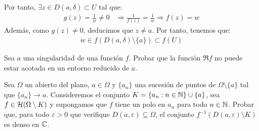 \begin{ejercicio}
\begin{description}
        Por tanto, $\exists z \in D(a, \delta)\subset U$ tal que:
        \begin{align*}
            g(z) = \frac{1}{w}\neq 0 &\Longrightarrow \frac{1}{f(z)} = \frac{1}{w}
            \Longrightarrow f(z) = w
        \end{align*}
        Además, como $g(z)\neq 0$, deducimos que $z\neq a$. Por tanto, tenemos que:
        \begin{align*}
            w \in f\left(D(a, \delta)\setminus \{a\}\right) \subset f(U)
        \end{align*}
    \end{description}
\end{ejercicio}


\begin{ejercicio}
    Sea $a$ una singularidad de una función $f$. Probar que la función $\Re f$ no puede estar acotada en un entorno reducido de $a$.
\end{ejercicio}

\begin{ejercicio}
    Sea $\Omega$ un abierto del plano, $a \in \Omega$ y $\{a_n\}$ una sucesión de puntos de $\Omega \setminus \{a\}$ tal que $\{a_n\} \to a$. Consideremos el conjunto $K = \{a_n : n \in \mathbb{N}\} \cup \{a\}$, sea $f \in \mathcal{H}(\Omega \setminus K)$ y supongamos que $f$ tiene un polo en $a_n$ para todo $n \in \mathbb{N}$. Probar que, para todo $\varepsilon > 0$ que verifique $D(a, \varepsilon) \subseteq \Omega$, el conjunto $f^{-1}(D(a, \varepsilon) \setminus K)$ es denso en $\mathbb{C}$.
\end{ejercicio}